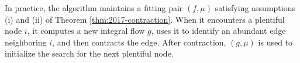 \documentclass[11pt]{article}
\newtheorem{theorem}{Theorem}[section]
\theoremstyle{definition}
\theoremstyle{definition}
\theoremstyle{definition}
\renewcommand{\todo}[1]{\hl{TODO: #1}}
\begin{document}
	In practice, the algorithm maintains a fitting pair $(f, \mu)$ satisfying
	assumptions (i) and (ii) of Theorem \ref{thm:2017-contraction}. When it encounters
	a plentiful node $i$, it computes a new integral flow $g$, uses it to identify
	an abundant edge neighboring $i$, and then contracts the edge.
	After contraction, $(g, \mu)$ is used to initialize the search for the next
	plentiful node.

%
\end{document}
